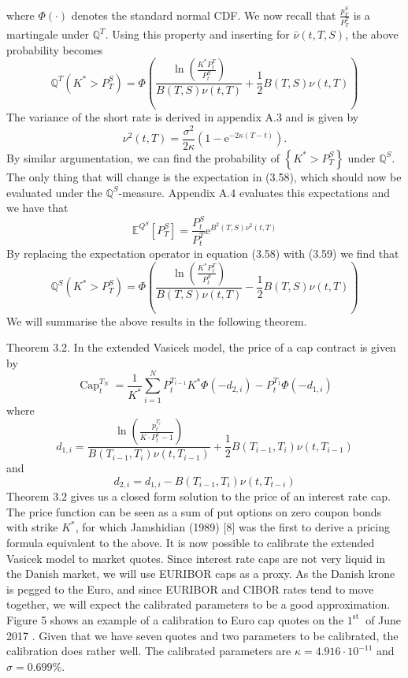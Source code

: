 \documentclass[12pt,twoside]{reedthesis}
\begin{document}
where \(\Phi(\cdot)\) denotes the standard normal CDF. We now recall that \(\frac{p_{T}^{S}}{P_{T}^{T}}\) is a martingale under \(\mathbb{Q}^{T}\). Using this property and inserting for \(\bar{\nu}(t, T, S)\), the above probability becomes
\[
\mathbb{Q}^{T}\left(K^{*}>P_{T}^{S}\right)=\Phi\left(\frac{\ln \left(\frac{K^{*} P_{t}^{T}}{P_{t}^{S}}\right)}{B(T, S) \nu(t, T)}+\frac{1}{2} B(T, S) \nu(t, T)\right)
\]
The variance of the short rate is derived in appendix A.3 and is given by
\[
\nu^{2}(t, T)=\frac{\sigma^{2}}{2 \kappa}\left(1-\mathrm{e}^{-2 \kappa(T-t)}\right) .
\]
By similar argumentation, we can find the probability of \(\left\{K^{*}>P_{T}^{S}\right\}\) under \(\mathbb{Q}^{S}\). The only thing that will change is the expectation in (3.58), which should now be evaluated under the \(\mathbb{Q}^{S}\)-measure. Appendix A.4 evaluates this expectations and we have that
\[
\mathbb{E}^{Q^{S}}\left[P_{T}^{S}\right]=\frac{P_{t}^{S}}{P_{t}^{T}} \mathrm{e}^{B^{2}(T, S) \nu^{2}(t, T)}
\]
By replacing the expectation operator in equation (3.58) with (3.59) we find that
\[
\mathbb{Q}^{S}\left(K^{*}>P_{T}^{S}\right)=\Phi\left(\frac{\ln \left(\frac{K^{*} P_{t}^{T}}{P_{t}^{S}}\right)}{B(T, S) \nu(t, T)}-\frac{1}{2} B(T, S) \nu(t, T)\right)
\]
We will summarise the above results in the following theorem.

Theorem 3.2. In the extended Vasicek model, the price of a cap contract is given by
\[
\operatorname{Cap}_{t}^{T_{N}}=\frac{1}{K^{*}} \sum_{i=1}^{N} P_{t}^{T_{i-1}} K^{*} \Phi\left(-d_{2, i}\right)-P_{t}^{T_{1}} \Phi\left(-d_{1, i}\right)
\]
where
\[
d_{1, i}=\frac{\ln \left(\frac{p_{t}^{T_{i}}}{K \cdot P_{t}^{T}-1}\right)}{B\left(T_{i-1}, T_{i}\right) \nu\left(t, T_{i-1}\right)}+\frac{1}{2} B\left(T_{i-1}, T_{i}\right) \nu\left(t, T_{i-1}\right)
\]
and
\[
d_{2, i}=d_{1, i}-B\left(T_{i-1}, T_{i}\right) \nu\left(t, T_{t-i}\right)
\]
Theorem \(3.2\) gives us a closed form solution to the price of an interest rate cap. The price function can be seen as a sum of put options on zero coupon bonds with strike \(K^{*}\), for which Jamshidian (1989) {[}8{]} was the first to derive a pricing formula equivalent to the above. It is now possible to calibrate the extended Vasicek model to market quotes. Since interest rate caps are not very liquid in the Danish market, we will use EURIBOR caps as a proxy. As the Danish krone is pegged to the Euro, and since EURIBOR and CIBOR rates tend to move together, we will expect the calibrated parameters to be a good approximation. Figure 5 shows an example of a calibration to Euro cap quotes on the \(1^{\text {st }}\) of June 2017 . Given that we have seven quotes and two parameters to be calibrated, the calibration does rather well. The calibrated parameters are \(\kappa=4.916 \cdot 10^{-11}\) and \(\sigma=0.699 \%\).
\end{document}
